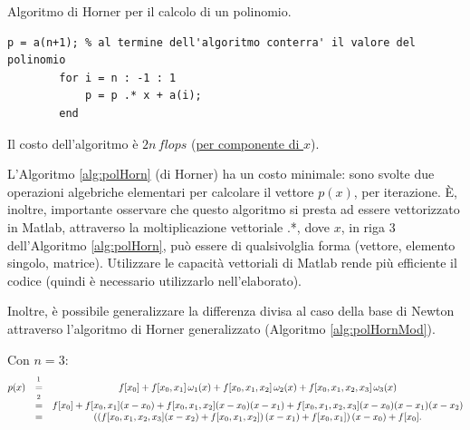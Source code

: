 \begin{algorithm}
\caption{Algoritmo di Horner per il calcolo di un polinomio.}\label{alg:polHorn}
    \begin{lstlisting}[style=Matlab-editor]
        p = a(n+1); % al termine dell'algoritmo conterra' il valore del polinomio
        for i = n : -1 : 1
            p = p .* x + a(i);
        end
    \end{lstlisting}
\end{algorithm}

\begin{remark}
    Il costo dell'algoritmo è $2n\, flops$ (\underline{per componente di $x$}).
\end{remark}

L'Algoritmo \ref{alg:polHorn} (di Horner) ha un costo minimale: sono svolte due operazioni algebriche elementari per calcolare il vettore $p(x)$, per iterazione. È, inoltre, importante osservare che questo algoritmo si presta ad essere vettorizzato in Matlab, attraverso la moltiplicazione vettoriale .*, dove $x$, in riga 3 dell'Algoritmo \ref{alg:polHorn}, può essere di qualsivolglia forma (vettore, elemento singolo, matrice). Utilizzare le capacità vettoriali di Matlab rende più efficiente il codice (quindi è necessario utilizzarlo nell'elaborato).

Inoltre, è possibile generalizzare la differenza divisa al caso della base di Newton attraverso l'algoritmo di Horner generalizzato (Algoritmo \ref{alg:polHornMod}).

\begin{example}
    Con $n=3$:
    \begin{equation*}
        \begin{matrix}
            p(x) &\overset{\footnotemark}{=}& f[x_0] + f[x_0,x_1]\,\omega_1(x) + f[x_0,x_1,x_2]\,\omega_2(x) + f[x_0,x_1,x_2,x_3]\,\omega_3(x)\\
            &\overset{\footnotemark}{=}& f[x_0]+f[x_0,x_1](x-x_0)+f[x_0,x_1,x_2](x-x_0)(x-x_1)+f[x_0,x_1,x_2,x_3](x-x_0)(x-x_1)(x-x_2)\\
            &=&\left(\left(f[x_0,x_1,x_2,x_3](x-x_2) + f[x_0,x_1,x_2]\right)(x-x_1)+f[x_0,x_1]\right)(x-x_0)+f[x_0].
        \end{matrix}
    \end{equation*}
    \addtocounter{footnote}{-1}
\end{example}

